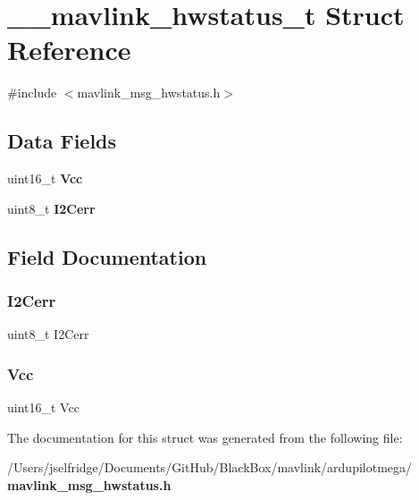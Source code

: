 \section{\+\_\+\+\_\+mavlink\+\_\+hwstatus\+\_\+t Struct Reference}
\label{struct____mavlink__hwstatus__t}


{\ttfamily \#include $<$mavlink\+\_\+msg\+\_\+hwstatus.\+h$>$}

\subsection*{Data Fields}
\begin{DoxyCompactItemize}
\item 
uint16\+\_\+t \textbf{ Vcc}
\item 
uint8\+\_\+t \textbf{ I2\+Cerr}
\end{DoxyCompactItemize}


\subsection{Field Documentation}
\mbox{\label{struct____mavlink__hwstatus__t_ad97897e4d1f767db15b9af6d8bb59e60}} 
\subsubsection{I2\+Cerr}
{\footnotesize\ttfamily uint8\+\_\+t I2\+Cerr}

\mbox{\label{struct____mavlink__hwstatus__t_a8dffd414788e464d456c4ae733adeadd}} 
\subsubsection{Vcc}
{\footnotesize\ttfamily uint16\+\_\+t Vcc}



The documentation for this struct was generated from the following file\+:\begin{DoxyCompactItemize}
\item 
/\+Users/jselfridge/\+Documents/\+Git\+Hub/\+Black\+Box/mavlink/ardupilotmega/\textbf{ mavlink\+\_\+msg\+\_\+hwstatus.\+h}\end{DoxyCompactItemize}
